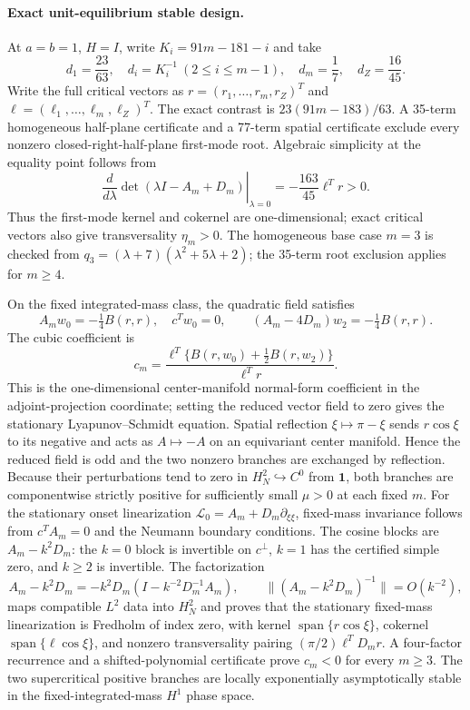 \documentclass[10pt]{article}
\begin{document}
\paragraph{Exact unit-equilibrium stable design.}
At $a=b=1$, $H=I$, write $K_i=91m-181-i$ and take
\[
d_1=\frac{23}{63},\quad d_i=K_i^{-1}\ (2\le i\le m-1),
\quad d_m=\frac17,\quad d_Z=\frac{16}{45}.
\]
Write the full critical vectors as
$r=(r_1,\ldots,r_m,r_Z)^T$ and
$\ell=(\ell_1,\ldots,\ell_m,\ell_Z)^T$.
The exact contrast is $23(91m-183)/63$. A 35-term homogeneous half-plane
certificate and a 77-term spatial certificate exclude every nonzero
closed-right-half-plane first-mode root.  Algebraic simplicity at the equality
point follows from
\[
 \left.\frac{d}{d\lambda}\det(\lambda I-A_m+D_m)\right|_{\lambda=0}
 =-\frac{163}{45}\ell^Tr>0.
\]
Thus the first-mode kernel and cokernel are one-dimensional; exact critical
vectors also give transversality $\eta_m>0$.
The homogeneous base case $m=3$ is checked from
$q_3=(\lambda+7)(\lambda^2+5\lambda+2)$; the 35-term root exclusion applies
for $m\ge4$.

On the fixed integrated-mass class, the quadratic field satisfies
\[
A_mw_0=-\tfrac14B(r,r),\quad c^Tw_0=0,
\qquad (A_m-4D_m)w_2=-\tfrac14B(r,r).
\]
The cubic coefficient is
\[
c_m=\frac{\ell^T\{B(r,w_0)+\tfrac12B(r,w_2)\}}{\ell^Tr}.
\]
This is the one-dimensional center-manifold normal-form coefficient in the
adjoint-projection coordinate; setting the reduced vector field to zero gives
the stationary Lyapunov--Schmidt equation.
Spatial reflection $\xi\mapsto\pi-\xi$ sends $r\cos\xi$ to its negative
and acts as $A\mapsto-A$ on an equivariant center manifold.  Hence the reduced
field is odd and the two nonzero branches are exchanged by reflection.
Because their perturbations tend to zero in $H_N^2\hookrightarrow C^0$ from
$\mathbf1$, both branches are componentwise strictly positive for sufficiently
small $\mu>0$ at each fixed $m$.
For the stationary onset linearization
$\mathcal L_0=A_m+D_m\partial_{\xi\xi}$, fixed-mass invariance follows from
$c^TA_m=0$ and the Neumann boundary conditions.  The cosine blocks are
$A_m-k^2D_m$: the $k=0$ block is invertible on $c^\perp$, $k=1$ has the
certified simple zero, and $k\ge2$ is invertible.  The factorization
\[
 A_m-k^2D_m=-k^2D_m(I-k^{-2}D_m^{-1}A_m),\qquad
 \|(A_m-k^2D_m)^{-1}\|=O(k^{-2}),
\]
maps compatible $L^2$ data into $H_N^2$ and proves that the stationary
fixed-mass linearization is Fredholm of index zero, with
kernel $\operatorname{span}\{r\cos\xi\}$, cokernel
$\operatorname{span}\{\ell\cos\xi\}$, and nonzero transversality pairing
$(\pi/2)\ell^TD_mr$.  A four-factor recurrence and a shifted-polynomial
certificate prove $c_m<0$ for every $m\ge3$. The two supercritical positive
branches are locally exponentially asymptotically stable in the
fixed-integrated-mass $H^1$ phase space.
\end{document}
